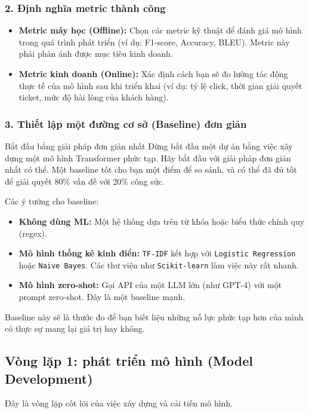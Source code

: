 \subsubsection{2. Định nghĩa metric thành công}
\begin{itemize}
    \item \textbf{Metric máy học (Offline):} Chọn các metric kỹ thuật để đánh giá mô hình trong quá trình phát triển (ví dụ: F1-score, Accuracy, BLEU). Metric này phải phản ánh được mục tiêu kinh doanh.
    \item \textbf{Metric kinh doanh (Online):} Xác định cách bạn sẽ đo lường tác động thực tế của mô hình sau khi triển khai (ví dụ: tỷ lệ click, thời gian giải quyết ticket, mức độ hài lòng của khách hàng).
\end{itemize}

\subsubsection{3. Thiết lập một đường cơ sở (Baseline) đơn giản}
\begin{keyidea}{Bắt đầu bằng giải pháp đơn giản nhất}
Đừng bắt đầu một dự án bằng việc xây dựng một mô hình Transformer phức tạp. Hãy bắt đầu với giải pháp đơn giản nhất có thể. Một baseline tốt cho bạn một điểm để so sánh, và có thể đã đủ tốt để giải quyết 80\% vấn đề với 20\% công sức.
\end{keyidea}

Các ý tưởng cho baseline:
\begin{itemize}
    \item \textbf{Không dùng ML:} Một hệ thống dựa trên từ khóa hoặc biểu thức chính quy (regex).
    \item \textbf{Mô hình thống kê kinh điển:} \texttt{TF-IDF} kết hợp với \texttt{Logistic Regression} hoặc \texttt{Naive Bayes}. Các thư viện như \texttt{Scikit-learn} làm việc này rất nhanh.
    \item \textbf{Mô hình zero-shot:} Gọi API của một LLM lớn (như GPT-4) với một prompt zero-shot. Đây là một baseline mạnh.
\end{itemize}

Baseline này sẽ là thước đo để bạn biết liệu những nỗ lực phức tạp hơn của mình có thực sự mang lại giá trị hay không.

\subsection{Vòng lặp 1: phát triển mô hình (Model Development)}
\label{ssec:workflow_step1}
Đây là vòng lặp cốt lõi của việc xây dựng và cải tiến mô hình.


